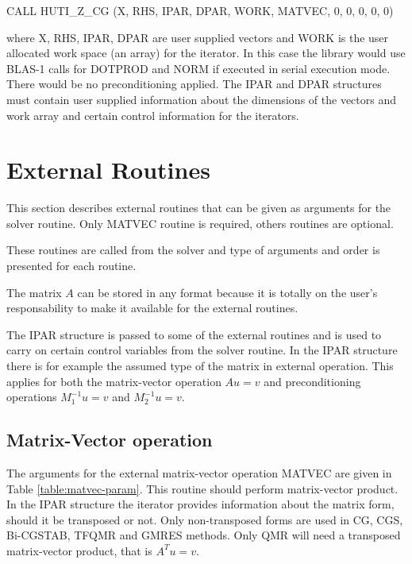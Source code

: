 \documentclass[11pt,a4paper,english,oneside]{report}
\begin{document}
\medskip
\noindent
{\ttfamily CALL HUTI\_Z\_CG (X, RHS, IPAR, DPAR, WORK, MATVEC, 0, 0, 0, 0, 0)}
\medskip

\noindent
where {\ttfamily X, RHS, IPAR, DPAR} are user supplied vectors and
{\ttfamily WORK} is the user allocated work space (an array) for the iterator.
In this case the library would use BLAS-1 calls for {\ttfamily DOTPROD} and
{\ttfamily NORM} if executed in serial execution mode. There would be no
preconditioning applied. The {\ttfamily IPAR} and {\ttfamily DPAR} structures
must contain user supplied information about the dimensions of the vectors
and work array and certain control information for the iterators.

\section{External Routines}

This section describes external routines that can be given as arguments
for the solver routine. Only {\ttfamily MATVEC} routine is required,
others routines are optional.

These routines are called from the solver and type of arguments and order
is presented for each routine.

The matrix $A$ can be stored in any format because it is totally on
the user's responsability to make it available for the external routines.

The {\ttfamily IPAR} structure is passed to some of the external routines
and is used to carry on certain control variables from the solver routine.
In the {\ttfamily IPAR} structure there is for example the assumed type
of the matrix in external operation. This applies for both the
matrix-vector operation
$Au = v$ and preconditioning operations $M_{1}^{-1}u = v$ and
$M_{2}^{-1}u = v$.

\subsection{Matrix-Vector operation}

The arguments for the external matrix-vector operation {\ttfamily MATVEC}
are given in Table \ref{table:matvec-param}. This routine should perform
matrix-vector product. In the {\ttfamily IPAR} structure the iterator
provides information about the matrix form, should it be transposed or not.
Only non-transposed forms are used in CG, CGS, Bi-CGSTAB, TFQMR and GMRES
methods.
Only QMR will need a transposed matrix-vector product, that is $A^{T}u = v$.
\end{document}
